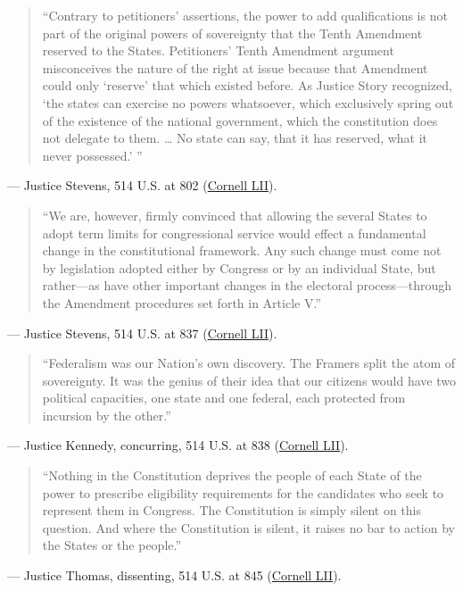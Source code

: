 \documentclass[12pt]{article}
\begin{document}
\begin{quote}
``Contrary to petitioners' assertions, the power to add qualifications is not part of the original powers of sovereignty that the Tenth Amendment reserved to the States. Petitioners' Tenth Amendment argument misconceives the nature of the right at issue because that Amendment could only `reserve' that which existed before. As Justice Story recognized, `the states can exercise no powers whatsoever, which exclusively spring out of the existence of the national government, which the constitution does not delegate to them. \ldots{} No state can say, that it has reserved, what it never possessed.' ''
\end{quote}
\noindent --- Justice Stevens, 514 U.S. at 802 (\href{https://www.law.cornell.edu/supct/html/93-1456.ZO.html}{Cornell LII}).

\begin{quote}
``We are, however, firmly convinced that allowing the several States to adopt term limits for congressional service would effect a fundamental change in the constitutional framework. Any such change must come not by legislation adopted either by Congress or by an individual State, but rather---as have other important changes in the electoral process---through the Amendment procedures set forth in Article V.''
\end{quote}
\noindent --- Justice Stevens, 514 U.S. at 837 (\href{https://www.law.cornell.edu/supct/html/93-1456.ZO.html}{Cornell LII}).

\begin{quote}
``Federalism was our Nation's own discovery. The Framers split the atom of sovereignty. It was the genius of their idea that our citizens would have two political capacities, one state and one federal, each protected from incursion by the other.''
\end{quote}
\noindent --- Justice Kennedy, concurring, 514 U.S. at 838 (\href{https://www.law.cornell.edu/supct/html/93-1456.ZC.html}{Cornell LII}).

\begin{quote}
``Nothing in the Constitution deprives the people of each State of the power to prescribe eligibility requirements for the candidates who seek to represent them in Congress. The Constitution is simply silent on this question. And where the Constitution is silent, it raises no bar to action by the States or the people.''
\end{quote}
\noindent --- Justice Thomas, dissenting, 514 U.S. at 845 (\href{https://www.law.cornell.edu/supct/html/93-1456.ZD.html}{Cornell LII}).
\end{document}

